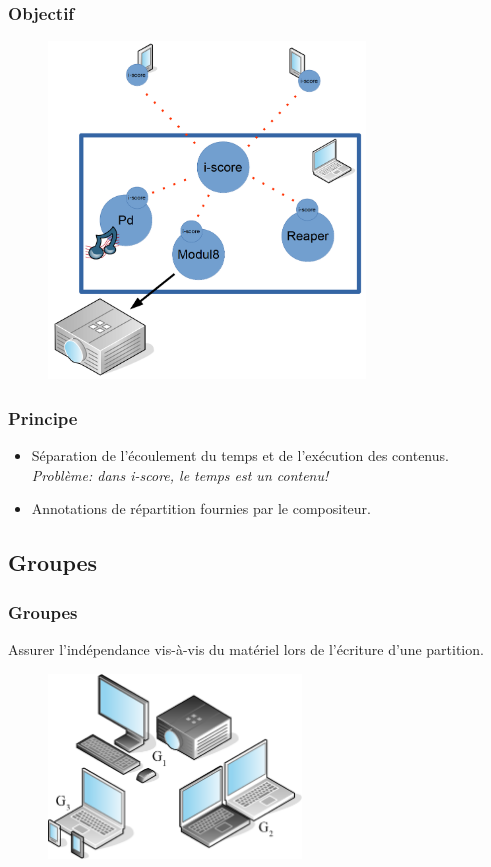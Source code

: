 \documentclass[handout]{beamer}
\begin{document}
\begin{frame}
\frametitle{Objectif}
\Large
\begin{figure}
    \vspace{-1cm}
    \includegraphics[width=0.75\textwidth]{draw/objective.png}
\end{figure}

\end{frame}

\begin{frame}
\frametitle{Principe}
\Large
\begin{itemize}
    \item Séparation de l'écoulement du temps et de l'exécution des contenus.
    ~\\ { \normalsize \textit{Problème: dans i-score, le temps est un contenu!} }
    \item Annotations de répartition fournies par le compositeur.
\end{itemize}
\end{frame}

\subsection{Groupes}
\begin{frame}
\frametitle{Groupes}
{\Large Assurer l'indépendance vis-à-vis du matériel lors de l'écriture d'une partition.}
\begin{figure}
	\centering
	\includegraphics[width=0.6\textwidth]{images/groupes.eps}
\end{figure}
\end{frame}
\end{document}
